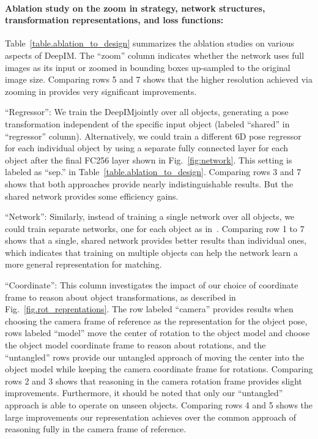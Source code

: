 \documentclass[twocolumn]{svjour3}
\newcommand{\dimnet}[0]{DeepIM}
\begin{document}
\paragraph{Ablation study on the zoom in strategy, network structures, transformation representations, and loss functions:}%
Table~\ref{table.ablation_to_design} summarizes the ablation studies on various aspects of \dimnet. The ``zoom'' column indicates whether the network uses full images as its input or zoomed in bounding boxes up-sampled to the original image size. Comparing rows 5 and 7 shows that the higher resolution achieved via zooming in provides very significant improvements. 

``Regressor'': We train the \dimnet\network jointly over all objects, generating a pose transformation independent of the specific input object (labeled ``shared'' in ``regressor'' column). Alternatively, we could train a different 6D pose regressor for each individual object by using a separate fully connected layer for each object after the final FC256 layer shown in Fig.~\ref{fig:network}.  This setting is labeled as ``sep.'' in Table~\ref{table.ablation_to_design}. Comparing rows 3 and 7 shows that both approaches provide nearly indistinguishable results. But the shared network provides some efficiency gains.

``Network'': Similarly, instead of training a single network over all objects, we could train separate networks, one for each object as in~\citep{rad2017bb8}. Comparing row 1 to 7 shows that a single, shared network provides better results than individual ones, which indicates that training on multiple objects can help the network learn a more general representation for matching.

``Coordinate'': This column investigates the impact of our choice of coordinate frame to reason about object transformations, as described in Fig.~\ref{fig.rot_reprentations}. 
The row labeled ``camera'' provides results when choosing the camera frame of reference as the representation for the object pose, 
rows labeled ``model'' move the center of rotation to the object model and choose the object model coordinate frame to reason about rotations, 
and the ``untangled'' rows provide our untangled approach of moving the center into the object model while keeping the camera coordinate frame for rotations. Comparing rows 2 and 3 shows that reasoning in the camera rotation frame provides slight improvements. 
Furthermore, it should be noted that only our ``untangled'' approach is able to operate on unseen objects.  
Comparing rows 4 and 5 shows the large improvements our representation achieves over the common approach of reasoning fully in the camera frame of reference. 
\end{document}
